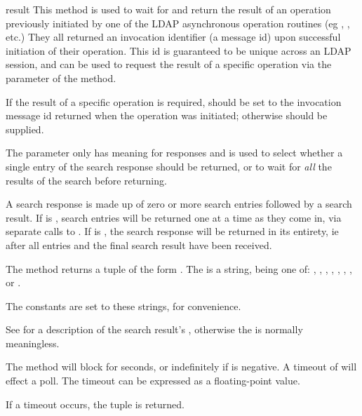 \begin{funcdesc}{result}{}
This method is used to wait for and return the result of an operation
previously initiated by one of the LDAP asynchronous operation routines
(eg , , etc.) They all returned
an invocation identifier (a message id) upon successful initiation of
their operation. This id is guaranteed to be unique across an LDAP session,
and can be used to request the result of a specific operation via the
 parameter of the  method.

If the result of a specific operation is required,  should
be set to the invocation message id returned when the operation was
initiated; otherwise  should be supplied. 

The 
parameter only has meaning for  responses and is used to select 
whether a single entry of the search response should be returned, or to
wait for \emph{all} the results of the search before returning. 

A search response is made up of zero or more search entries followed by
a search result. If  is , search entries will be returned one
at a time as they come in, via separate calls to . If
 is , the search response will be returned in its 
entirety, ie after all entries and the final search result have been
received.

The method returns a tuple of the form 
.
The  is a string, being one of:
, , , 
, , , 
, or .

The constants  are set to these strings, for convenience.

See  for a description of the search result's ,
otherwise the  is normally meaningless.

The  method will block for  seconds, or 
indefinitely if  is negative. 
A timeout of  will effect a poll. 
The timeout can be expressed as a floating-point value.

If a timeout occurs, the tuple  is returned.

\end{funcdesc}

